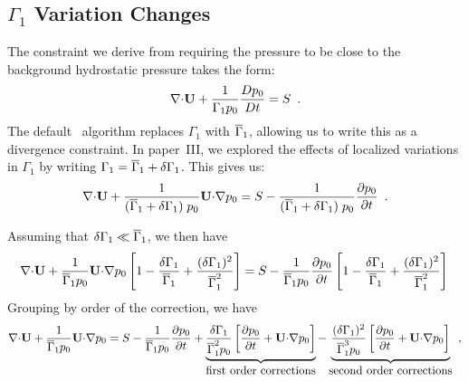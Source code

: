 \subsection{\label{sec:flow:gamma1vary} $\Gamma_1$ Variation Changes}

The constraint we derive from requiring the pressure to be close to
the background hydrostatic pressure takes the form:
\begin{equation}
\mathbf{\nabla} \mathbf{\cdot} {\bf U} + \frac{1}{\Gamma_1 p_0} \frac{Dp_0}{Dt} = S \enskip .
\end{equation}
The default \maestroex\ algorithm replaces $\Gamma_1$ with $\overline{\Gamma}_1$,
allowing us to write this as a divergence constraint.  In paper~III,
we explored the effects of localized variations in $\Gamma_1$ by
writing $\Gamma_1 = \overline{\Gamma}_1 + \delta \Gamma_1$.  This gives us:
\begin{equation}
\mathbf{\nabla} \mathbf{\cdot} {\bf U} + \frac{1}{(\overline{\Gamma}_1 + \delta \Gamma_1) \; p_0} 
  {\bf U} \mathbf{\cdot} \mathbf{\nabla} p_0 = S - \frac{1}{(\overline{\Gamma}_1 + \delta \Gamma_1) \; p_0} 
  \frac{\partial p_0}{\partial t} \enskip .
\end{equation}

Assuming that $\delta \Gamma_1 \ll \overline{\Gamma}_1$, we then
have 
\begin{equation}
\mathbf{\nabla} \mathbf{\cdot} {\bf U} + \frac{1}{\overline{\Gamma}_1 p_0} {\bf U} \mathbf{\cdot} \mathbf{\nabla} p_0 
 \left [ 1 - \frac{\delta\Gamma_1}{\overline{\Gamma}_1} + \frac{(\delta\Gamma_1)^2}{\overline{\Gamma}_1^2} \right ]
= S - \frac{1}{\overline{\Gamma}_1 p_0} \frac{\partial p_0}{\partial t} 
 \left [ 1 - \frac{\delta\Gamma_1}{\overline{\Gamma}_1} + \frac{(\delta\Gamma_1)^2}{\overline{\Gamma}_1^2} \right ] \\
\end{equation}
Grouping by order of the correction, we have
\begin{equation}
\mathbf{\nabla} \mathbf{\cdot} {\bf U} + \frac{1}{\overline{\Gamma}_1 p_0} {\bf U} \mathbf{\cdot} \mathbf{\nabla} p_0 
= S - \frac{1}{\overline{\Gamma}_1 p_0} \frac{\partial p_0}{\partial t} +
\underbrace{\frac{\delta \Gamma_1}{\overline{\Gamma}_1^2 p_0} 
            \left [\frac{\partial p_0}{\partial t} + {\bf U} \mathbf{\cdot} \mathbf{\nabla} p_0\right ]}_{\mbox{first order corrections}} 
 -
  \underbrace{\frac{(\delta\Gamma_1)^2}{\overline{\Gamma}_1^3 p_0}
            \left [ \frac{\partial p_0}{\partial t} + {\bf U} \mathbf{\cdot} \mathbf{\nabla} p_0 \right ]}_{\mbox{second order corrections}} \enskip , \label{eq:gammafull}
\end{equation}

